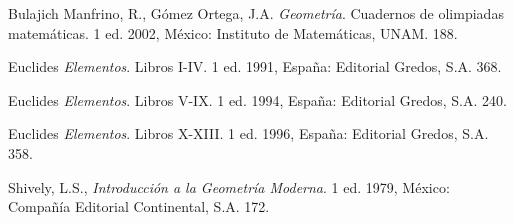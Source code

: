 \begin{thebibliography}{99}

 Bulajich Manfrino, R., Gómez Ortega, J.A. {\it Geometría}. Cuadernos de olimpiadas matemáticas. 1 ed. 2002, México: Instituto de Matemáticas, UNAM. 188.

 Euclides {\it Elementos}. Libros I-IV. 1 ed. 1991, España: Editorial Gredos, S.A. 368.

 Euclides {\it Elementos}. Libros V-IX. 1 ed. 1994, España: Editorial Gredos, S.A. 240.

 Euclides {\it Elementos}. Libros X-XIII. 1 ed. 1996, España: Editorial Gredos, S.A. 358.

 Shively, L.S., {\it Introducción a la Geometría Moderna}. 1 ed. 1979, México: Compañía Editorial Continental, S.A. 172.

\end{thebibliography}


